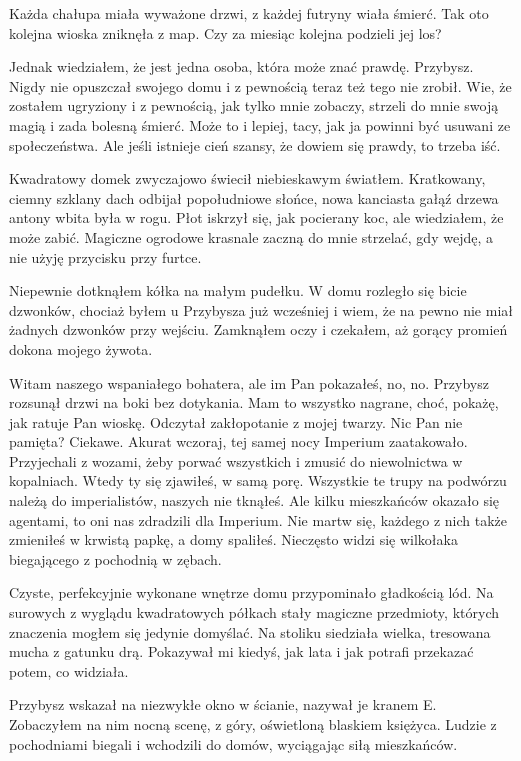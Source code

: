 Każda chałupa miała wyważone drzwi, z każdej futryny wiała śmierć.
Tak oto kolejna wioska zniknęła z map.
Czy za miesiąc kolejna podzieli jej los? 

Jednak wiedziałem, że jest jedna osoba, która może znać prawdę.
Przybysz. Nigdy nie opuszczał swojego domu i z pewnością teraz też tego nie zrobił.
Wie, że zostałem ugryziony i z pewnością, jak tylko mnie zobaczy, strzeli do mnie swoją magią i zada bolesną śmierć.
Może to i lepiej, tacy, jak ja powinni być usuwani ze społeczeństwa. 
Ale jeśli istnieje cień szansy, że dowiem się prawdy, to trzeba iść.

\divider{}
Kwadratowy domek zwyczajowo świecił niebieskawym światłem.
Kratkowany, ciemny szklany dach odbijał popołudniowe słońce, nowa kanciasta gałąź drzewa antony wbita była w rogu.
Płot iskrzył się, jak pocierany koc, ale wiedziałem, że może zabić.
Magiczne ogrodowe krasnale zaczną do mnie strzelać, gdy wejdę, a nie użyję przycisku przy furtce.

Niepewnie dotknąłem kółka na małym pudełku. 
W domu rozległo się bicie dzwonków, chociaż byłem u Przybysza już wcześniej i wiem, że na pewno nie miał żadnych dzwonków przy wejściu.
Zamknąłem oczy i czekałem, aż gorący promień dokona mojego żywota.

\ds{} Witam naszego wspaniałego bohatera, ale im Pan pokazałeś, no, no. 
\dm{} Przybysz rozsunął drzwi na boki bez dotykania. \dm{} Mam to wszystko nagrane, choć, pokażę, jak ratuje Pan wioskę.
\dm{} Odczytał zakłopotanie z mojej twarzy.
\dm{} Nic Pan nie pamięta? Ciekawe. Akurat wczoraj, tej samej nocy Imperium zaatakowało.
Przyjechali z wozami, żeby porwać wszystkich i zmusić do niewolnictwa w kopalniach.
Wtedy ty się zjawiłeś, w samą porę. Wszystkie te trupy na podwórzu należą do imperialistów, naszych nie tknąłeś.
Ale kilku mieszkańców okazało się agentami, to oni nas zdradzili dla Imperium. 
Nie martw się, każdego z nich także zmieniłeś w krwistą papkę, a domy spaliłeś. Nieczęsto widzi się wilkołaka biegającego z pochodnią w zębach.\de{}

Czyste, perfekcyjnie wykonane wnętrze domu przypominało gładkością lód.
Na surowych z wyglądu kwadratowych półkach stały magiczne przedmioty, których znaczenia mogłem się jedynie domyślać.
Na stoliku siedziała wielka, tresowana mucha z gatunku drą. Pokazywał mi kiedyś, jak lata i jak potrafi przekazać potem, co widziała.

Przybysz wskazał na niezwykłe okno w ścianie, nazywał je kranem E.
Zobaczyłem na nim nocną scenę, z góry, oświetloną blaskiem księżyca. 
Ludzie z pochodniami biegali i wchodzili do domów, wyciągając siłą mieszkańców.

